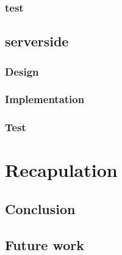      \subsection{test}

  \section{serverside} %
    \subsection{Design}
    \subsection{Implementation}
    \subsection{Test}

\chapter{Recapulation}
  \section{Conclusion}
  \section{Future work}

\appendix



